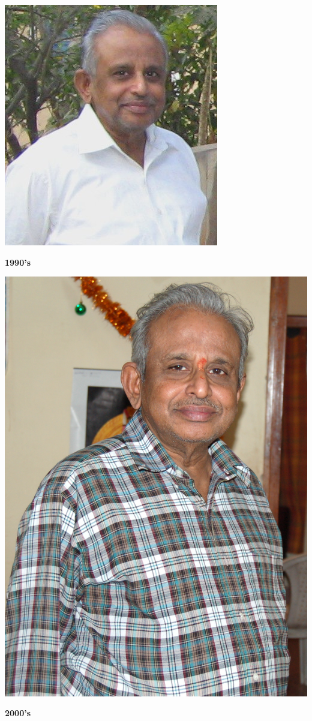 \begin{minipage}{6cm}
\centerline{\includegraphics[scale=0.65]{src/images/1990s.jpg}}
\centerline{\bf 1990's}
\bigskip

\centerline{\includegraphics[scale=0.07]{src/images/2006.jpg}}
\centerline{\bf 2000's}
\end{minipage}
\vfill

